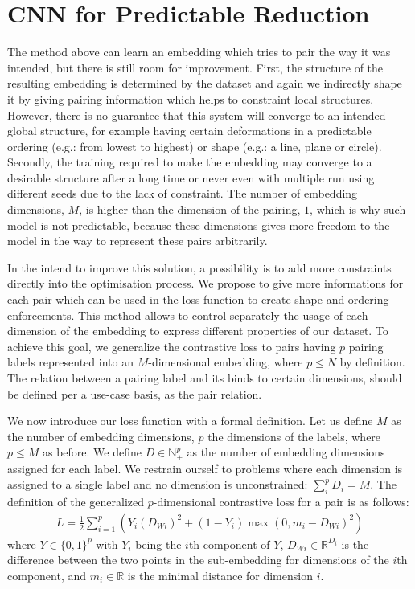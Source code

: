 \documentclass[a4paper,12pt]{report}
\newcommand{\N}{\mathbb{N}}
\newcommand{\R}{\mathbb{R}}
\newcommand{\eg}{e.g.}
\begin{document}
\section{CNN for Predictable Reduction}
The method above can learn an embedding which tries to pair the way it was intended, but there is still room for improvement.
First, the structure of the resulting embedding is determined by the dataset and again we indirectly shape it by giving pairing information which helps to constraint local structures.
However, there is no guarantee that this system will converge to an intended global structure, for example having certain deformations in a predictable ordering (\eg: from lowest to highest) or shape (\eg: a line, plane or circle).
Secondly, the training required to make the embedding may converge to a desirable structure after a long time or never even with multiple run using different seeds due to the lack of constraint.
The number of embedding dimensions, $M$, is higher than the dimension of the pairing, $1$, which is why such model is not predictable, because these dimensions gives more freedom to the model in the way to represent these pairs arbitrarily.

In the intend to improve this solution, a possibility is to add more constraints directly into the optimisation process.
We propose to give more informations for each pair which can be used in the loss function to create shape and ordering enforcements.
This method allows to control separately the usage of each dimension of the embedding to express different properties of our dataset.
To achieve this goal, we generalize the contrastive loss to pairs having $p$ pairing labels represented into an $M$-dimensional embedding, where $p \leq N$ by definition.
The relation between a pairing label and its binds to certain dimensions, should be defined per a use-case basis, as the pair relation.

We now introduce our loss function with a formal definition.
Let us define $M$ as the number of embedding dimensions, $p$ the dimensions of the labels, where $p \leq M$ as before.
We define $D \in \N_+^p$ as the number of embedding dimensions assigned for each label.
We restrain ourself to problems where each dimension is assigned to a single label and no dimension is unconstrained: $\sum_i^p D_i = M$.
The definition of the generalized $p$-dimensional contrastive loss for a pair is as follows:
\begin{eqnarray}
    L = \frac{1}{2} \sum_{i=1}^p \left( Y_i (D_{Wi})^2 + (1-Y_i) \max(0, m_i - D_{Wi})^2 \right)
\end{eqnarray}
where $Y \in \{0,1\}^p$ with $Y_i$ being the $i$th component of $Y$, $D_{Wi} \in \R^{D_i}$ is the difference between the two points in the sub-embedding for dimensions of the $i$th component, and $m_i \in \R$ is the minimal distance for dimension $i$.
\end{document}

